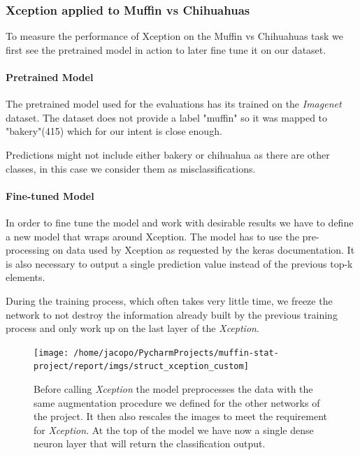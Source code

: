 \subsubsection{Xception applied to Muffin vs Chihuahuas}
\label{subsubsec:xception}

To measure the performance of Xception on the Muffin vs Chihuahuas task we first see the pretrained model in action
to later fine tune it on our dataset.

\paragraph{Pretrained Model} The pretrained model used for the evaluations has its trained on the
\textit{Imagenet} dataset. The dataset does not provide a label "muffin" so it was mapped to "bakery"(415) which
for our intent is close enough.

Predictions might not include either bakery or chihuahua as there are other classes, in this case we consider them as misclassifications.


\paragraph{Fine-tuned Model}
In order to fine tune the model and work with desirable results we have to define a new model that wraps around Xception.
The model has to use the pre-processing on data used by Xception as requested by the keras documentation. It is also
necessary to output a single prediction value instead of the previous top-k elements.

During the training process, which often takes very little time,  we freeze the network to not destroy the information
already built by the previous training process and only work up on the last layer of the \textit{Xception}.
\begin{figure}[h]

        \centering
        \texttt{[image: /home/jacopo/PycharmProjects/muffin-stat-project/report/imgs/struct\_xception\_custom]}
    \caption{
        Before calling \textit{Xception} the model preprocesses the data with the same augmentation procedure we defined for the other
        networks of the project. It then also rescales the images to meet the requirement for \textit{Xception}.
        At the top of the model we have now a single dense neuron layer that will return the classification output.
    }\label{fig:figurexception}
\end{figure}



